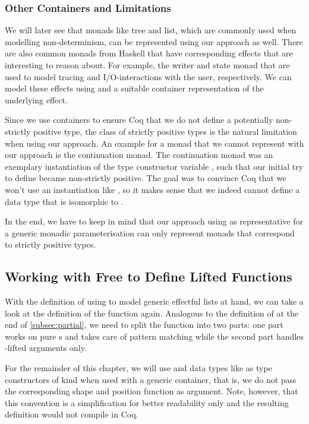 \subsubsection{Other Containers and Limitations}

We will later see that monads like tree and list, which are commonly used when modelling non\--determinism, can be represented using our approach as well.
There are also common monads from Haskell that have corresponding effects that are interesting to reason about.
For example, the writer and state monad that are used to model tracing and I/O\--interactions with the user, respectively.
We can model these effects using  and a suitable container representation of the underlying effect.

Since we use containers to ensure Coq that we do not define a potentially non\--strictly positive type, the class of strictly positive types is the natural limitation when using our approach.
An example for a monad that we cannot represent with our approach is the continuation monad.
The continuation monad  was an exemplary instantiation of the type constructor variable , such that our initial try to define  became non\--strictly positive.
The goal was to convince Coq that we won't use an instantiation like , so it makes sense that we indeed cannot define a data type that is isomorphic to .

In the end, we have to keep in mind that our approach using  as representative for a generic monadic parameterisation can only represent monads that correspond to strictly positive types.

\subsection{Working with Free to Define Lifted Functions}
\label{subsec:liftedFunctions}

With the definition of  using  to model generic effectful lists at hand, we can take a look at the definition of the function  again.
Analogous to the definition of  at the end of \autoref{subsec:partial}, we need to split the function into two parts: one part works on pure s and takes care of pattern matching while the second part handles \--lifted arguments only.

For the remainder of this chapter, we will use  and data types like  as type constructors of kind  when used with a generic container, that is, we do not pass the corresponding shape and position function as argument.
Note, however, that this convention is a simplification for better readability only and the resulting definition would not compile in Coq.

